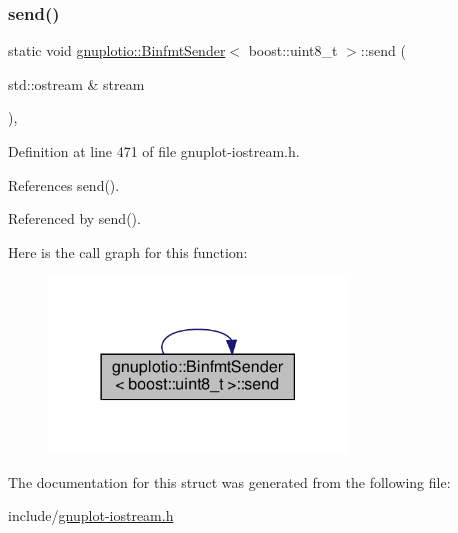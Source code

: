 \subsubsection{\texorpdfstring{send()}{send()}}
{\footnotesize\ttfamily static void \hyperlink{structgnuplotio_1_1_binfmt_sender}{gnuplotio\+::\+Binfmt\+Sender}$<$ boost\+::uint8\+\_\+t $>$\+::send (\begin{DoxyParamCaption}\item[{std\+::ostream \&}]{stream }\end{DoxyParamCaption})\hspace{0.3cm}{\ttfamily [inline]}, {\ttfamily [static]}}



Definition at line 471 of file gnuplot-\/iostream.\+h.



References send().



Referenced by send().

Here is the call graph for this function\+:\nopagebreak
\begin{figure}[H]
\begin{center}
\leavevmode
\includegraphics[width=225pt]{structgnuplotio_1_1_binfmt_sender_3_01boost_1_1uint8__t_01_4_a57d45c45f1ee19614c972bc82c4b214c_cgraph}
\end{center}
\end{figure}


The documentation for this struct was generated from the following file\+:\begin{DoxyCompactItemize}
\item 
include/\hyperlink{gnuplot-iostream_8h}{gnuplot-\/iostream.\+h}\end{DoxyCompactItemize}
